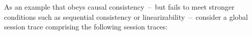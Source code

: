 \documentclass[journal, compsoc]{IEEEtran}
\begin{document}
	
	As an example that obeys causal consistency~--~but fails to meet stronger conditions such as sequential consistency or linearizability~--~consider a global session trace comprising the following session traces:
	
\end{document}
